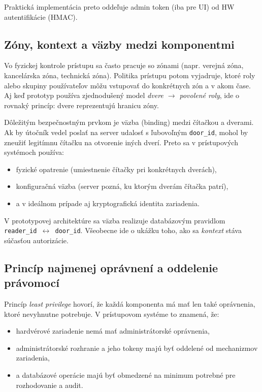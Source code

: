 \documentclass[journal,a4paper,onecolumn]{IEEEtran}
\begin{document}
Praktická implementácia preto oddeľuje admin token (iba pre UI) od HW autentifikácie (HMAC).

\subsection{Zóny, kontext a väzby medzi komponentmi}

Vo fyzickej kontrole prístupu sa často pracuje so zónami (napr. verejná zóna, kancelárska zóna, technická zóna). Politika prístupu potom vyjadruje, ktoré roly alebo skupiny používateľov môžu vstupovať do konkrétnych zón a v akom čase. Aj keď prototyp používa zjednodušený model \emph{dvere $\rightarrow$ povolené roly}, ide o rovnaký princíp: dvere reprezentujú hranicu zóny.

Dôležitým bezpečnostným prvkom je väzba (binding) medzi čítačkou a dverami. Ak by útočník vedel poslať na server udalosť s ľubovoľným \texttt{door\_id}, mohol by zneužiť legitímnu čítačku na otvorenie iných dverí. Preto sa v prístupových systémoch používa:

\begin{itemize}[leftmargin=*,itemsep=2pt]
  \item fyzické opatrenie (umiestnenie čítačky pri konkrétnych dverách),
  \item konfiguračná väzba (server pozná, ku ktorým dverám čítačka patrí),
  \item a v ideálnom prípade aj kryptografická identita zariadenia.
\end{itemize}

V prototypovej architektúre sa väzba realizuje databázovým pravidlom \texttt{reader\_id $\leftrightarrow$ door\_id}. Všeobecne ide o ukážku toho, ako sa \emph{kontext} stáva súčasťou autorizácie.

\subsection{Princíp najmenej oprávnení a oddelenie právomocí}

Princíp \emph{least privilege}\cite{SaltzerSchroeder1975} hovorí, že každá komponenta má mať len také oprávnenia, ktoré nevyhnutne potrebuje. V prístupovom systéme to znamená, že:

\begin{itemize}[leftmargin=*,itemsep=2pt]
  \item hardvérové zariadenie nemá mať administrátorské oprávnenia,
  \item administrátorské rozhranie a jeho tokeny majú byť oddelené od mechanizmov zariadenia,
  \item a databázové operácie majú byť obmedzené na minimum potrebné pre rozhodovanie a audit.
\end{itemize}
\end{document}
